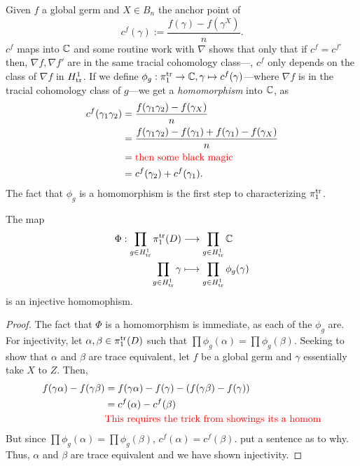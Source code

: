 Given \(f\) a global germ and \(X \in B_n\) the anchor point of
\[
  c^f(\gamma) := \frac{f(\gamma)-f(\gamma^X)}{n}.
\]
\(c^f\) maps into \(\mathbb{C} \) and some routine work with \(\nabla\) shows that
only that if \(c^f=c^{f'}\) then, \(\nabla f,\nabla f'\) are in the same tracial
cohomology class---\ie, \(c^f\) only depends on the class of \(\nabla f \) in
\(H^1_{\operatorname{tr}}\). If we define
\(\phi_g: \pi_1^{\operatorname{tr}}\to \mathbb{C} , \gamma \mapsto c^f(\gamma)\)---where \(\nabla f\)
is in the tracial cohomology class of \(g\)---we get a
\emph{homomorphism} into \(\mathbb{C} \), as
\begin{align*}
  c^f(\gamma_1\gamma_2) &= \frac{f(\gamma_1\gamma_2) - f(\gamma_X)}{n} \\
             &= \frac{f(\gamma_1\gamma_2) - f(\gamma_1) + f(\gamma_1) -f(\gamma_X)}{n} \\
             &= {\color{red} \text{then some black magic}} \\
             &= c^f(\gamma_2) + c^f(\gamma_1).
\end{align*}
The fact that \(\phi_g\) is a homomorphism is the first step to characterizing
\(\pi_1^{\operatorname{tr}}\).
\begin{lemma}
  The map
  \begin{align*}
	  \Phi: \prod_{g \in H^1_{\operatorname{tr}}} \pi_1^{\operatorname{tr}}(D) &\longrightarrow \prod_{g \in H^1_{\operatorname{tr}}}\mathbb{C}  \\
    \prod_{g \in H^1_{\operatorname{tr}}} \gamma &\longmapsto \prod_{g \in H^1_{\operatorname{tr}}} \phi_g(\gamma)
  \end{align*}
  is an injective homomophism.
\end{lemma}

\begin{proof}
  The fact that \(\Phi\) is a homomorphism is immediate, as each of the
  \(\phi_g\) are. For injectivity,
  let \(\alpha,\beta \in \pi_1^{\operatorname{tr}}(D)\) such that \(\prod\phi_g(\alpha)=\prod\phi_g(\beta)\). Seeking to show that
  \(\alpha\) and \(\beta\) are trace equivalent, let \(f\) be a global germ and
  \(\gamma\) essentially take \(X\) to \(Z\). Then,
  \begin{align*}
    f(\gamma\alpha)-f(\gamma\beta) &= f(\gamma\alpha) - f(\gamma) - \left( f(\gamma\beta)-f(\gamma) \right) \\
                &= c^f(\alpha) - c^f(\beta)\\
                & {\color{red} \text{This requires the trick from showings its a
                  homom}}
  \end{align*}
  But since \(\prod\phi_g(\alpha)=\prod\phi_g(\beta)\),
  \(c^f(\alpha) = c^f(\beta)\). {\color{red} put a sentence as to why}. Thus, \(\alpha\) and \(\beta\) are trace
  equivalent and we have shown injectivity.
\end{proof}

